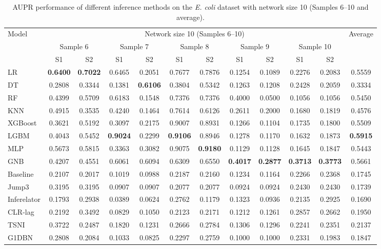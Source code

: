 \begin{table}[!h]
\centering
\caption{AUPR performance of different inference methods on the \textit{E. coli} dataset with network size 10 (Samples 6--10 and average).}
\label{tab:size10_part2}
{\renewcommand{\arraystretch}{0.6}
\setlength{\tabcolsep}{2pt}
\begin{tabular}{lccccccccccc}
\toprule
Model
& \multicolumn{10}{c}{Network size 10 (Samples 6--10)}
& Average \\
\cmidrule(lr){2-11}
& \multicolumn{2}{c}{Sample 6}
& \multicolumn{2}{c}{Sample 7}
& \multicolumn{2}{c}{Sample 8}
& \multicolumn{2}{c}{Sample 9}
& \multicolumn{2}{c}{Sample 10}
& \\
\cmidrule(lr){2-3}\cmidrule(lr){4-5}\cmidrule(lr){6-7}
\cmidrule(lr){8-9}\cmidrule(lr){10-11}
& S1 & S2 & S1 & S2 & S1 & S2 & S1 & S2 & S1 & S2 & \\
\midrule
LR
& \textbf{0.6400} & \textbf{0.7022} & 0.6465 & 0.2051 & 0.7677 & 0.7876
& 0.1254 & 0.1089 & 0.2276 & 0.2083 & 0.5559 \\
DT
& 0.2808 & 0.3344 & 0.1381 & \textbf{0.6106} & 0.3804 & 0.5342
& 0.1263 & 0.1208 & 0.2428 & 0.2059 & 0.3334 \\
RF
& 0.4399 & 0.5709 & 0.6183 & 0.1548 & 0.7376 & 0.7376
& 0.4000 & 0.0500 & 0.1056 & 0.1056 & 0.5450 \\
KNN
& 0.4915 & 0.3535 & 0.4240 & 0.1464 & 0.7614 & 0.6126
& 0.2611 & 0.2000 & 0.1680 & 0.1819 & 0.4576 \\
XGBoost
& 0.3621 & 0.5192 & 0.3097 & 0.2175 & 0.9007 & 0.8931
& 0.1266 & 0.1104 & 0.1735 & 0.1800 & 0.5509 \\
LGBM
& 0.4043 & 0.5452 & \textbf{0.9024} & 0.2299 & \textbf{0.9106} & 0.8946
& 0.1278 & 0.1170 & 0.1632 & 0.1873 & \textbf{0.5915} \\
MLP
& 0.5673 & 0.5815 & 0.3363 & 0.3082 & 0.9075 & \textbf{0.9180}
& 0.1129 & 0.1128 & 0.1645 & 0.1847 & 0.5443 \\
GNB
& 0.4207 & 0.4551 & 0.6061 & 0.6094 & 0.6309 & 0.6550
& \textbf{0.4017} & \textbf{0.2877} & \textbf{0.3713} & \textbf{0.3773} & 0.5661 \\
\midrule
Baseline
& 0.2107 & 0.2017 & 0.1019 & 0.0988 & 0.2187 & 0.2160
& 0.1234 & 0.1164 & 0.2266 & 0.2368 & 0.1745 \\
Jump3
& 0.3195 & 0.3195 & 0.0907 & 0.0907 & 0.2077 & 0.2077
& 0.0924 & 0.0924 & 0.2430 & 0.2430 & 0.1739 \\
Inferelator
& 0.1793 & 0.2938 & 0.0389 & 0.0624 & 0.2762 & 0.1179
& 0.1323 & 0.0936 & 0.2135 & 0.2925 & 0.1690 \\
CLR-lag
& 0.2192 & 0.3492 & 0.0829 & 0.1050 & 0.2123 & 0.2171
& 0.1212 & 0.1261 & 0.2857 & 0.2662 & 0.1950 \\
TSNI
& 0.3722 & 0.2487 & 0.1820 & 0.1231 & 0.2666 & 0.2784
& 0.1306 & 0.1296 & 0.2241 & 0.2351 & 0.2137 \\
G1DBN
& 0.2808 & 0.2084 & 0.1033 & 0.0825 & 0.2297 & 0.2759
& 0.1000 & 0.1000 & 0.2331 & 0.1983 & 0.1847 \\
\bottomrule
\end{tabular}
}
\end{table}






